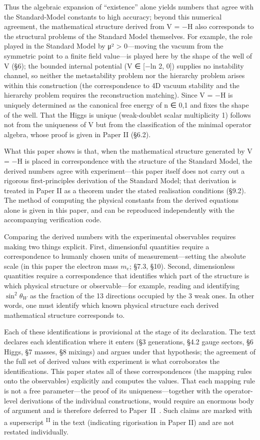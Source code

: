 \documentclass[12pt,a4paper]{article}
\newcommand{\PII}{\textsuperscript{\textup{II}}}
\begin{document}
Thus the algebraic expansion of ``existence'' alone yields numbers that agree with the Standard-Model constants to high accuracy; beyond this numerical agreement, the mathematical structure derived from V = −H also corresponds to the structural problems of the Standard Model themselves. For example, the role played in the Standard Model by μ² > 0---moving the vacuum from the symmetric point to a finite field value---is played here by the shape of the well of V (§6); the bounded internal potential (V ∈ [−ln 2, 0]) supplies no instability channel, so neither the metastability problem nor the hierarchy problem arises within this construction (the correspondence to 4D vacuum stability and the hierarchy problem requires the reconstruction matching). Since V = −H is uniquely determined as the canonical free energy of n ∈ {0,1} and fixes the shape of the well. That the Higgs is unique (weak-doublet scalar multiplicity 1) follows not from the uniqueness of V but from the classification of the minimal operator algebra, whose proof is given in Paper II (§6.2).

What this paper shows is that, when the mathematical structure generated by V = −H is placed in correspondence with the structure of the Standard Model, the derived numbers agree with experiment---this paper itself does not carry out a rigorous first-principles derivation of the Standard Model; that derivation is treated in Paper II as a theorem under the stated realisation conditions (§9.2). The method of computing the physical constants from the derived equations alone is given in this paper, and can be reproduced independently with the accompanying verification code.

Comparing the derived numbers with the experimental observables requires making two things explicit. First, dimensionful quantities require a correspondence to humanly chosen units of measurement---setting the absolute scale (in this paper the electron mass $m_e$; \S7.3, \S10). Second, dimensionless quantities require a correspondence that identifies which part of the structure is which physical structure or observable---for example, reading and identifying $\sin^2\!\theta_W$ as the fraction of the 13 directions occupied by the 3 weak ones. In other words, one must identify which known physical structure each derived mathematical structure corresponds to.

Each of these identifications is provisional at the stage of its declaration. The text declares each identification where it enters (\S3 generations, \S4.2 gauge sectors, \S6 Higgs, \S7 masses, \S8 mixings) and argues under that hypothesis; the agreement of the full set of derived values with experiment is what corroborates the identifications. This paper states all of these correspondences (the mapping rules onto the observables) explicitly and computes the values. That each mapping rule is not a free parameter---the proof of its uniqueness---together with the operator-level derivations of the individual constructions, would require an enormous body of argument and is therefore deferred to Paper~II~\cite{paper2}. Such claims are marked with a superscript \PII{} in the text (indicating rigorisation in Paper II) and are not restated individually.
\end{document}

